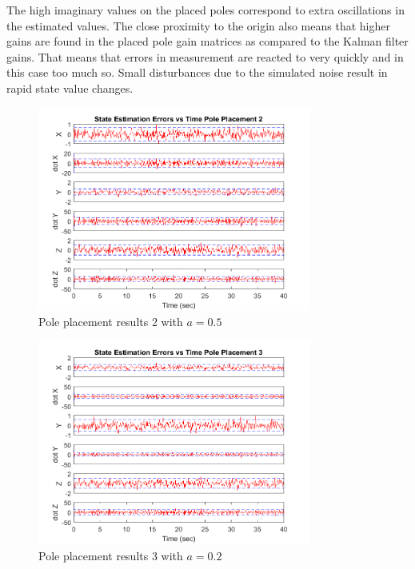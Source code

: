\documentclass[12pt]{extarticle}
\begin{document}
{{The high imaginary values on the placed poles correspond to extra oscillations in the estimated values. The close proximity to the origin also means that higher gains are found in the placed pole gain matrices as compared to the Kalman filter gains. That means that errors in measurement are reacted to very quickly and in this case too much so. Small disturbances due to the simulated noise result in rapid state value changes.
\begin{figure}[h!]
    \centering
    \includegraphics[width=0.8\textwidth,clip=true,trim={0cm 0 0cm 0}]{Images/pole2}
    \caption{Pole placement results 2 with $a=0.5$}\label{fig:pole2}
\end{figure}

\begin{figure}[h!]
    \centering
    \includegraphics[width=0.8\textwidth,clip=true,trim={0cm 0 0cm 0}]{Images/pole3}
    \caption{Pole placement results 3 with $a=0.2$}\label{fig:pole3}
\end{figure}

}
}
\pagebreak
\end{document}
